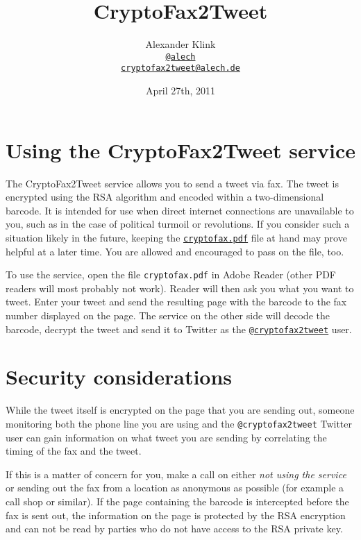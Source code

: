 \documentclass[DIV14,11pt]{scrartcl}
\begin{document}
\title{CryptoFax2Tweet}
\author{Alexander Klink\\\texttt{\href{https://twitter.com/alech}{@alech}}\\\texttt{\href{mailto:cryptofax2tweet@alech.de}{cryptofax2tweet@alech.de}}}
\date{April 27th, 2011}

\maketitle

\thispagestyle{empty}
\section*{Using the CryptoFax2Tweet service}

The CryptoFax2Tweet service allows you to send a tweet via fax.
The tweet is encrypted using the RSA algorithm and encoded within a two-dimensional
	barcode.
It is intended for use when direct internet connections are unavailable to you,
	such as in the case of political turmoil or revolutions.
If you consider such a situation likely in the future, keeping the
\texttt{\href{https://cryptofax2tweet.cdn.as250.net/cryptofax.pdf}{cryptofax.pdf}} file at hand may prove helpful at a later time.
You are allowed and encouraged to pass on the file, too.

To use the service, open the file \texttt{cryptofax.pdf} in Adobe Reader
	(other PDF readers will most probably not work).
Reader will then ask you what you want to tweet.
Enter your tweet and send the resulting page with the barcode to the fax number
	displayed on the page.
The service on the other side will decode the barcode, decrypt the tweet and
send it to Twitter as the \texttt{\href{https://twitter.com/cryptofax2tweet}{@cryptofax2tweet}} user.

\section*{Security considerations}

While the tweet itself is encrypted on the page that you are sending out,
	someone monitoring both the phone line you are using and the
	\texttt{@cryptofax2tweet} Twitter user can gain information on what tweet
	you are sending by correlating the timing of the fax and the tweet.

If this is a matter of concern for you, make a call on either
	\emph{not using the service} or sending out the fax from a location as
	anonymous as possible (for example a call shop or similar).
If the page containing the barcode is intercepted before the fax is sent out,
	the information on the page is protected by the RSA encryption and can not
	be read by parties who do not have access to the RSA private key.
\end{document}
